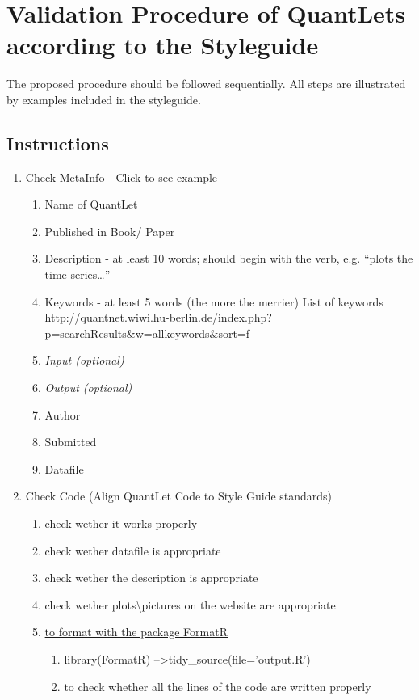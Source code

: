 \documentclass{article}
\begin{document}
\section*{Validation Procedure of QuantLets according to the Styleguide}
The proposed procedure should be followed sequentially. All steps are illustrated by examples included in the styleguide.

\subsection*{Instructions} %
\begin{enumerate}
	\item Check MetaInfo - \label{MetaInfo-ini}\hyperref[MetaInfo]{Click to see example}
	\begin{enumerate}
		\item Name of QuantLet
		\item Published in Book/ Paper
		\item Description - at least 10 words; should begin with the verb, e.g. “plots the time series…”
		\item Keywords - at least 5 words (the more the merrier)
		List of keywords \url{http://quantnet.wiwi.hu-berlin.de/index.php?p=searchResults&w=allkeywords&sort=f}
		\item \textit{Input (optional)}
		\item \textit{Output (optional)}
		\item Author
		\item Submitted
		\item Datafile
	\end{enumerate}
	\item Check Code (Align QuantLet Code to Style Guide standards) 
	\begin {enumerate}
		\item check wether it works properly
		\item check wether datafile is appropriate
		\item check wether the description is appropriate
		\item check wether plots\textbackslash pictures on the website are appropriate
		\item \label{formatR-ini}\hyperref[formatR]{to format with the package	FormatR}
			\begin{enumerate}
				\item library(FormatR)  --\textgreater tidy\_source(file='output.R')
				\item to check whether all the lines of the code are written properly

\end{enumerate}
\end{enumerate}
\end{enumerate}
\end{document}
